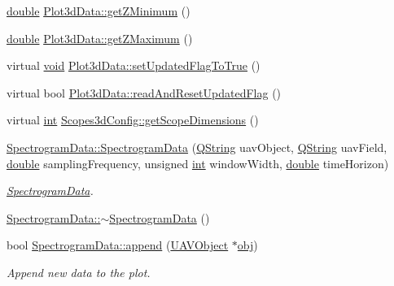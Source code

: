 \begin{DoxyCompactItemize}
\item 
\hyperlink{_super_l_u_support_8h_a8956b2b9f49bf918deed98379d159ca7}{double} \hyperlink{group___scope_plugin_ga1b7cd5b46f3d8a13bcdba217cc7fe392}{Plot3d\-Data\-::get\-Z\-Minimum} ()
\item 
\hyperlink{_super_l_u_support_8h_a8956b2b9f49bf918deed98379d159ca7}{double} \hyperlink{group___scope_plugin_ga9d0722b373e8cf2ea23d29cc8717f8ef}{Plot3d\-Data\-::get\-Z\-Maximum} ()
\item 
virtual \hyperlink{group___u_a_v_objects_plugin_ga444cf2ff3f0ecbe028adce838d373f5c}{void} \hyperlink{group___scope_plugin_ga08cc07e86d20dc6dad41488e34bb196c}{Plot3d\-Data\-::set\-Updated\-Flag\-To\-True} ()
\item 
virtual bool \hyperlink{group___scope_plugin_ga3d0789d96a38bc51e7e1be13754ba43e}{Plot3d\-Data\-::read\-And\-Reset\-Updated\-Flag} ()
\item 
virtual \hyperlink{ioapi_8h_a787fa3cf048117ba7123753c1e74fcd6}{int} \hyperlink{group___scope_plugin_ga19f02e368a922611f86005f7e18f12bf}{Scopes3d\-Config\-::get\-Scope\-Dimensions} ()
\item 
\hyperlink{group___scope_plugin_gaaac18b4298b3bb722d59928336254cd1}{Spectrogram\-Data\-::\-Spectrogram\-Data} (\hyperlink{group___u_a_v_objects_plugin_gab9d252f49c333c94a72f97ce3105a32d}{Q\-String} uav\-Object, \hyperlink{group___u_a_v_objects_plugin_gab9d252f49c333c94a72f97ce3105a32d}{Q\-String} uav\-Field, \hyperlink{_super_l_u_support_8h_a8956b2b9f49bf918deed98379d159ca7}{double} sampling\-Frequency, unsigned \hyperlink{ioapi_8h_a787fa3cf048117ba7123753c1e74fcd6}{int} window\-Width, \hyperlink{_super_l_u_support_8h_a8956b2b9f49bf918deed98379d159ca7}{double} time\-Horizon)
\begin{DoxyCompactList}\small\item\em \hyperlink{class_spectrogram_data}{Spectrogram\-Data}. \end{DoxyCompactList}\item 
\hyperlink{group___scope_plugin_gafe709b6e448db73f8548bc2b76f27d19}{Spectrogram\-Data\-::$\sim$\-Spectrogram\-Data} ()
\item 
bool \hyperlink{group___scope_plugin_gab2c059e5c5dea398eed663062df84fb6}{Spectrogram\-Data\-::append} (\hyperlink{class_u_a_v_object}{U\-A\-V\-Object} $\ast$\hyperlink{glext_8h_a0c0d4701a6c89f4f7f0640715d27ab26}{obj})
\begin{DoxyCompactList}\small\item\em Append new data to the plot. \end{DoxyCompactList}\item 

\end{DoxyCompactItemize}
